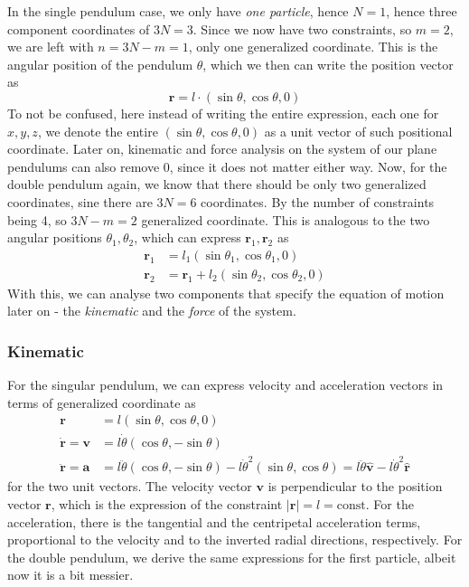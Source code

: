 In the single pendulum case, we only have \textit{one particle}, hence $N=1$, hence three component coordinates of $3N=3$. Since we now have two constraints, so $m=2$, we are left with $n=3N-m=1$, only one generalized coordinate. This is the angular position of the pendulum $\theta$, which we then can write the position vector as 
\begin{equation}
  \mathbf{r} = l\cdot (\sin{\theta}, \cos{\theta},0)
\end{equation} 
To not be confused, here instead of writing the entire expression, each one for $x,y,z$, we denote the entire $(\sin{\theta}, \cos{\theta},0)$ as a unit vector of such positional coordinate. Later on, kinematic and force analysis on the system of our plane pendulums can also remove $0$, since it does not matter either way.  Now, for the double pendulum again, we know that there should be only two generalized coordinates, sine there are $3N=6$ coordinates. By the number of constraints being 4, so $3N-m=2$ generalized coordinate. This is analogous to the two angular positions $\theta_{1},\theta_{2}$, which can express $\mathbf{r}_{1},\mathbf{r}_{2}$ as 
\begin{align}
  \mathbf{r}_{1} & = l_{1} (\sin{\theta_{1}}, \cos{\theta_{1}},0)\\
  \mathbf{r}_{2} & = \mathbf{r}_{1} + l_{2} (\sin{\theta_{2}}, \cos{\theta_{2}},0)
\end{align}
With this, we can analyse two components that specify the equation of motion later on - the \textit{kinematic} and the \textit{force} of the system. 
\subsubsection{Kinematic}
For the singular pendulum, we can express velocity and acceleration vectors in terms of generalized coordinate as
\begin{align}
  \mathbf{r} & = l(\sin{\theta},\cos{\theta},0) \\
  \dot{\mathbf{r}} = \mathbf{v} & = l\dot{\theta}(\cos{\theta},-\sin{\theta}) \\
  \ddot{\mathbf{r}}= \mathbf{a} & = l\ddot{\theta} (\cos{\theta},-\sin{\theta}) - l \dot{\theta}^{2} (\sin{\theta},\cos{\theta}) = l \ddot{\theta} \hat{\mathbf{v}} - l \dot{\theta}^{2} \hat{\mathbf{r}}
\end{align}
for the two unit vectors. The velocity vector $\mathbf{v}$ is perpendicular to the position vector $\mathbf{r}$, which is the expression of the constraint $\lvert \mathbf{r}\rvert = l = \mathrm{const}$. For the acceleration, there is the tangential and the centripetal acceleration terms, proportional to the velocity and to the inverted radial directions, respectively. For the double pendulum, we derive the same expressions for the first particle, albeit now it is a bit messier. 


